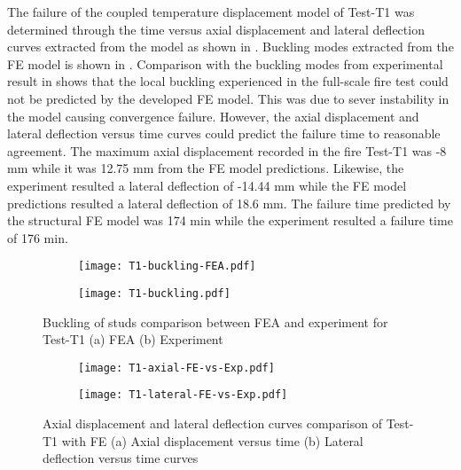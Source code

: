 The failure of the coupled temperature displacement model of Test-T1 was determined through the time versus axial displacement and lateral deflection curves extracted from the model as shown in . Buckling modes extracted from the FE model is shown in . Comparison with the buckling modes from experimental result in  shows that the local buckling experienced in the full-scale fire test could not be predicted by the developed FE model. This was due to sever instability in the model causing convergence failure. However, the axial displacement and lateral deflection versus time curves could predict the failure time to reasonable agreement. The maximum axial displacement recorded in the fire Test-T1 was -8 mm while it was 12.75 mm from the FE model predictions. Likewise, the experiment resulted a lateral deflection of -14.44 mm while the FE model predictions resulted a lateral deflection of 18.6 mm. The failure time predicted by the structural FE model was 174 min while the experiment resulted a failure time of 176 min.  
\begin{figure}[!htbp]
	\centering
	\begin{subfigure}[b]{0.8\textwidth}
		\centering
		\texttt{[image: T1-buckling-FEA.pdf]}
		\caption{}
		\label{subfig:T1-buckling-FEA}
	\end{subfigure}
	\begin{subfigure}[b]{0.2\textwidth}
		\centering
		\texttt{[image: T1-buckling.pdf]}
		\caption{}
		\label{subfig:T1-buckling-FEA-Exp}
	\end{subfigure}
	   \caption{Buckling of studs comparison between FEA and experiment for Test-T1 (a) FEA (b) Experiment}
	   \label{fig:T1-buckling-FE-vs-Exp}
\end{figure} 
\begin{figure}[!htbp]
	\centering
	\begin{subfigure}[b]{0.45\textwidth}
		\centering
		\texttt{[image: T1-axial-FE-vs-Exp.pdf]}
		\caption{}
		\label{subfig:T1-axial-FE-vs-Exp}
	\end{subfigure}
	\begin{subfigure}[b]{0.45\textwidth}
		\centering
		\texttt{[image: T1-lateral-FE-vs-Exp.pdf]}
		\caption{}
		\label{subfig:T1-lateral-FE-vs-Exp}
	\end{subfigure}
	   \caption{Axial displacement and lateral deflection curves comparison of Test-T1 with FE (a) Axial displacement versus time (b) Lateral deflection versus time curves}
	   \label{fig:T1-structural-FE-vs-Exp}
\end{figure} 

